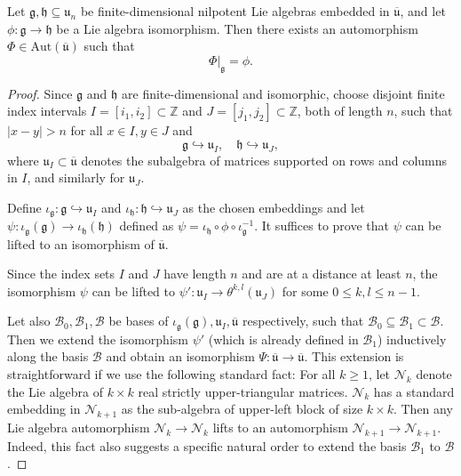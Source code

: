 \documentclass[10pt,a4paper]{amsart}
\begin{document}
  \begin{prop}\label{prop:extension}  Let  \( \mathfrak{g}, \mathfrak{h} \subseteq \mathfrak{u}_n \) be finite-dimensional nilpotent Lie algebras embedded in \(\overline{ \mathfrak{u}} \), and let \( \phi : \mathfrak{g} \to \mathfrak{h} \) be a Lie algebra isomorphism. Then there exists an automorphism \( \Phi \in \mathrm{Aut}(\overline{\mathfrak{u}}) \) such that
\[
\Phi|_{\mathfrak{g}} = \phi.
\]
\end{prop}

\begin{proof}
Since \( \mathfrak{g} \) and \( \mathfrak{h} \) are finite-dimensional and isomorphic, choose disjoint finite index intervals \( I = [i_1, i_2] \subset \mathbb{Z} \) and \( J = [j_1, j_2] \subset \mathbb{Z} \), both of length \( n \), such that $|x-y| > n$ for all $x\in I, y\in J$ and 
\[
\mathfrak{g} \hookrightarrow \mathfrak{u}_I,\quad \mathfrak{h} \hookrightarrow \mathfrak{u}_J,
\]
where \( \mathfrak{u}_I \subset \overline{\mathfrak{u}} \) denotes the subalgebra of matrices supported on rows and columns in \( I \), and similarly for \( \mathfrak{u}_J \).

\medskip 

Define \( \iota_{\mathfrak{g}} : \mathfrak{g} \hookrightarrow \mathfrak{u}_I \) and \( \iota_{\mathfrak{h}} : \mathfrak{h} \hookrightarrow \mathfrak{u}_J \) as the chosen embeddings and let $\psi : \iota_{\mathfrak{g}}(\mathfrak{g})\to \iota_{\mathfrak{h}}(\mathfrak{h})$ defined as $\psi =                \iota_{\mathfrak{h}}\circ \phi \circ \iota_{\mathfrak{g}}^{-1}$. It suffices to prove that $\psi $ can be lifted to an isomorphism of \(\overline{ \mathfrak{u}} \). 

\medskip 

 Since the index sets $I$ and $J$ have length $n$ and are at a distance at least $n$, the isomorphism $\psi $ can be lifted to $\psi ':\mathfrak{u}_I\to \theta ^{k,l}(\mathfrak{u}_J)$ for some $0\leq k, l\leq n-1$.  

\medskip 

 Let also $\mathcal{B}_0, \mathcal{B}_1, \mathcal{B}$ be bases of $\iota_{\mathfrak{g}}(\mathfrak{g}), \mathfrak{u}_I, \overline{\mathfrak{u}}$ respectively, such that $\mathcal{B}_0\subseteq \mathcal{B}_1\subset \mathcal{B}$. Then we extend the isomorphism $\psi '$ (which is already defined in $\mathcal{B}_1$) inductively along the basis $\mathcal{B}$ and obtain an isomorphism $\Psi : \overline{\mathfrak{u}}\to \overline{\mathfrak{u}}$. This extension is straightforward if we use the following standard fact: For all $k\geq 1$, let $\mathcal{N}_k$ denote the Lie algebra of $k\times k$ real strictly upper-triangular matrices. $\mathcal{N}_k$ has a standard embedding in $\mathcal{N}_{k+1}$ as the sub-algebra of upper-left block of size $k\times k$.  Then any Lie algebra automorphism $\mathcal{N}_k\to \mathcal{N}_k$ lifts to an automorphism $\mathcal{N}_{k+1}\to \mathcal{N}_{k+1}$. Indeed, this fact also suggests a specific natural order to extend the basis $\mathcal{B}_1$ to $\mathcal{B}$.


\end{proof}
\end{document}
